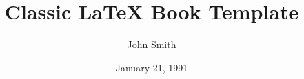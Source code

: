 \documentclass[a4paper,11pt]{book}
\begin{document}
\title{\textbf{Classic LaTeX Book Template}}
\author{John Smith}
\date{January 21, 1991}


\maketitle






\tableofcontents








\nocite{*}


\end{document}
